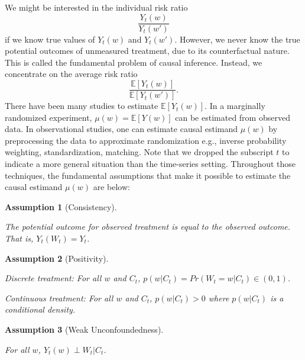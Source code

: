 \documentclass[12pt]{article}
\newtheorem{asm}{Assumption}
\begin{document}
We might be interested in the individual risk ratio
\begin{equation}
	\frac{Y_t(w)}{Y_t(w')}
	\label{eqn:individual risk ratio}
\end{equation}	
if we know true values of $Y_t(w)$ and $Y_t(w')$.
However, we never know the true potential outcomes of unmeasured treatment, 
due to its counterfactual nature.
This is called the fundamental problem of causal inference\cite{holland1986}.
Instead, we concentrate on the average risk ratio
\begin{equation}
	\frac{\mathbb{E}\left[ Y_t(w) \right]}{\mathbb{E}\left[ Y_t(w') \right]}.
	\label{eqn:average risk ratio}
\end{equation}
There have been many studies to estimate $\mathbb{E}[Y_t(w)]$.
In a marginally randomized experiment, 
$\mu(w) = \mathbb{E}[Y(w)]$ can be estimated from observed data\cite{rubin1974}.
In observational studies, 
one can estimate causal estimand $\mu(w)$ by preprocessing the data to approximate randomization 
e.g., inverse probability weighting, standardization, matching\cite{rosenbaum1983}.
Note that we dropped the subscript $t$ to indicate a more general situation than the time-series setting.
Throughout those techniques, 
the fundamental assumptions that make it possible to estimate the causal estimand $\mu(w)$ are below:

\begin{asm}[Consistency]\label{asm:consistency}\hfill

	The potential outcome for observed treatment is equal to the observed outcome.
	That is, $Y_t(W_t) = Y_t$.
\end{asm}

\begin{asm}[Positivity]\label{asm:positivity}\hfill

	Discrete treatment:
	For all $w$ and $C_t$, $p(w\lvert C_t) = Pr\left ( W_t = w \lvert C_t\right ) \in (0, 1)$.

	Continuous treatment:
	For all $w$ and $C_t$, $p(w\lvert C_t) > 0$ where $p(w\lvert C_t)$ is a conditional density.
\end{asm}


\begin{asm}[Weak Unconfoundedness]\label{asm:unconfoundedness} \hfill

	For all $w$, $Y_{t}(w) \perp W_t \lvert C_t$.
\end{asm}
\end{document}
